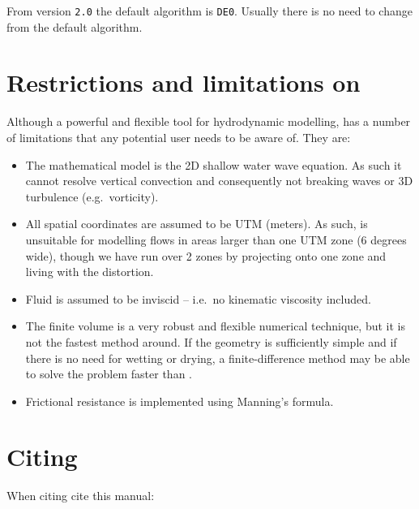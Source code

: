 \documentclass{manual}
\begin{document}
From version \verb|2.0| the default algorithm is \verb|DE0|. Usually there is no need to change from the default algorithm.



\section{Restrictions and limitations on \anuga}
\label{ch:limitations}

Although a powerful and flexible tool for hydrodynamic modelling, \anuga has a
number of limitations that any potential user needs to be aware of. They are:

\begin{itemize}
  \item The mathematical model is the 2D shallow water wave equation.
  As such it cannot resolve vertical convection and consequently not breaking
  waves or 3D turbulence (e.g.\ vorticity).
  \item All spatial coordinates are assumed to be UTM (meters). As such,
  \anuga is unsuitable for modelling flows in areas larger than one UTM zone
  (6 degrees wide), though we have run over 2 zones by projecting onto one zone and
  living with the distortion.
  \item Fluid is assumed to be inviscid -- i.e.\ no kinematic viscosity included.
  \item The finite volume is a very robust and flexible numerical technique,
  but it is not the fastest method around. If the geometry is sufficiently
  simple and if there is no need for wetting or drying, a finite-difference
  method may be able to solve the problem faster than \anuga.
  \item Frictional resistance is implemented using Manning's formula.
\end{itemize}

\pagebreak
\section{Citing \anuga}

When citing \anuga cite this manual:
\end{document}
